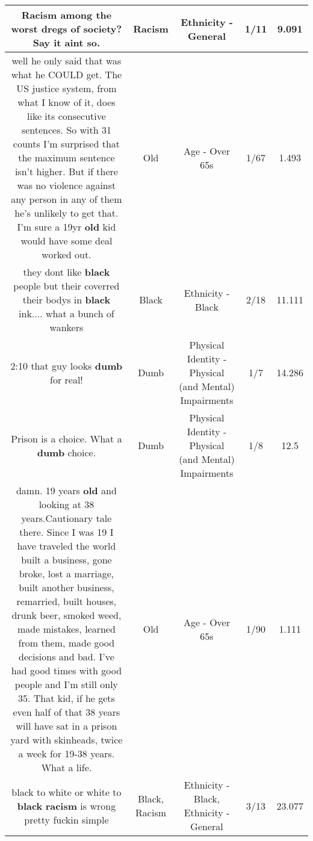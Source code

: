\documentclass[11pt]{article}
\newlength\mylength
\begin{document}
\begin{center}
\begin{longtable}{|C{.65\mylength}|C{.30\mylength}|C{.12\mylength}|C{.12\mylength}|C{.12\mylength}|}
  \small Racism among the worst dregs of society? Say it aint so.\normalsize   & Racism & Ethnicity - General & 1/11 & 9.091 \\  \hline
  \small well he only said that was what he COULD get. The US justice system, from what I know of it, does like its consecutive sentences. So with 31 counts I'm surprised that the maximum sentence isn't higher. But if there was no violence against any person in any of them he's unlikely to get that. I'm sure a 19yr \textbf{old} kid would have some deal worked out.\normalsize   & Old & Age - Over 65s & 1/67 & 1.493 \\  \hline
  \small they dont like \textbf{black} people but their coverred their bodys in \textbf{black} ink.... what a bunch of wankers\normalsize   & Black & Ethnicity - Black & 2/18 & 11.111 \\  \hline
  \small 2:10 that guy looks \textbf{dumb} for real!\normalsize   & Dumb & Physical Identity - Physical (and Mental) Impairments & 1/7 & 14.286 \\  \hline
  \small Prison is a choice. What a \textbf{dumb} choice.\normalsize   & Dumb & Physical Identity - Physical (and Mental) Impairments & 1/8 & 12.5 \\  \hline
  \small damn. 19 years \textbf{old} and looking at 38 years.Cautionary tale there. Since I was 19 I have traveled the world built a business, gone broke, lost a marriage, built another business, remarried, built houses, drunk beer, smoked weed, made mistakes, learned from them, made good decisions and bad. I've had good times with good people and I'm still only 35. That kid, if he gets even half of that 38 years will have sat in a prison yard with skinheads, twice a week for 19-38 years. What a life.\normalsize   & Old & Age - Over 65s & 1/90 & 1.111 \\  \hline
  \small black to white   or white to \textbf{black} \textbf{racism} is wrong  pretty fuckin simple\normalsize   & Black, Racism & Ethnicity - Black, Ethnicity - General & 3/13 & 23.077 \\  \hline

\end{longtable}
\end{center}
\end{document}
